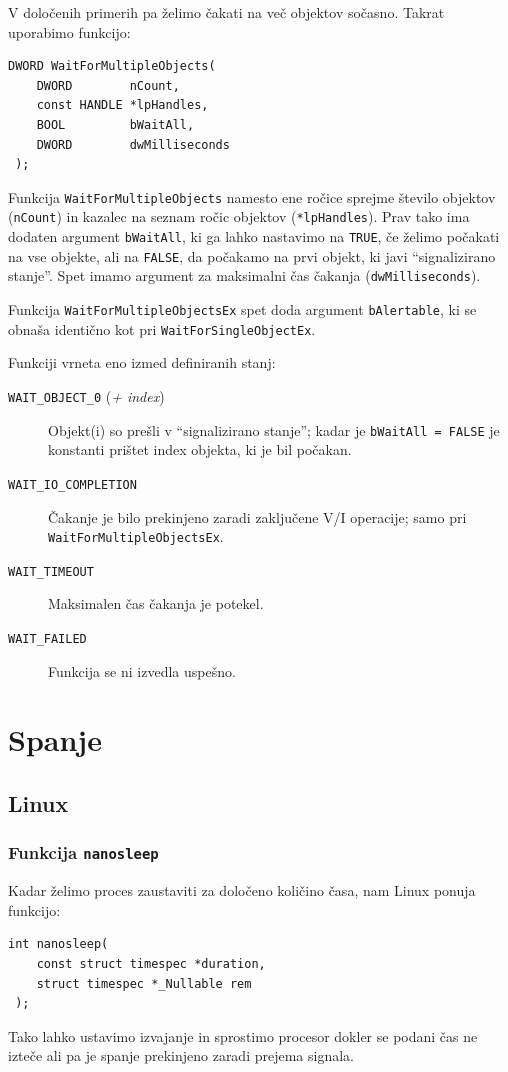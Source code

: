 \documentclass[a4paper,12pt,openright]{book}
\begin{document}
V določenih primerih pa želimo čakati na več objektov sočasno.
Takrat uporabimo funkcijo:
\begin{lstlisting}[style=func]
 DWORD WaitForMultipleObjects(
	DWORD        nCount,
	const HANDLE *lpHandles,
	BOOL         bWaitAll,
	DWORD        dwMilliseconds
 );
\end{lstlisting}

Funkcija \texttt{WaitForMultipleObjects} namesto ene ročice sprejme število objektov (\texttt{nCount}) in kazalec na seznam ročic objektov (\texttt{*lpHandles}).
Prav tako ima dodaten argument \texttt{bWaitAll}, ki ga lahko nastavimo na \texttt{TRUE}, če želimo počakati na vse objekte, ali na \texttt{FALSE}, da počakamo na prvi objekt, ki javi ``signalizirano stanje''.
Spet imamo argument za maksimalni čas čakanja (\texttt{dwMilliseconds}).

Funkcija \texttt{WaitForMultipleObjectsEx} spet doda argument \texttt{bAlertable}, ki se obnaša identično kot pri \texttt{WaitForSingleObjectEx}.

Funkciji vrneta eno izmed definiranih stanj:
\begin{description}
	\item[\texttt{WAIT\_OBJECT\_0} (\textit{+ index})] Objekt(i) so prešli v ``signalizirano stanje''; kadar je \texttt{bWaitAll = FALSE} je konstanti prištet index objekta, ki je bil počakan.
	\item[\texttt{WAIT\_IO\_COMPLETION}] Čakanje je bilo prekinjeno zaradi zaključene V/I operacije; samo pri \texttt{WaitForMultipleObjectsEx}.
	\item[\texttt{WAIT\_TIMEOUT}] Maksimalen čas čakanja je potekel.
	\item[\texttt{WAIT\_FAILED}] Funkcija se ni izvedla uspešno.
\end{description}

\section{Spanje}

\subsection{Linux}

\subsubsection{Funkcija \texttt{nanosleep}}

Kadar želimo proces zaustaviti za določeno količino časa, nam Linux ponuja funkcijo:
\begin{lstlisting}[style=func]
 int nanosleep(
	const struct timespec *duration,
	struct timespec *_Nullable rem
 );
\end{lstlisting}
Tako lahko ustavimo izvajanje in sprostimo procesor dokler se podani čas ne izteče ali pa je spanje prekinjeno zaradi prejema signala.
\end{document}
